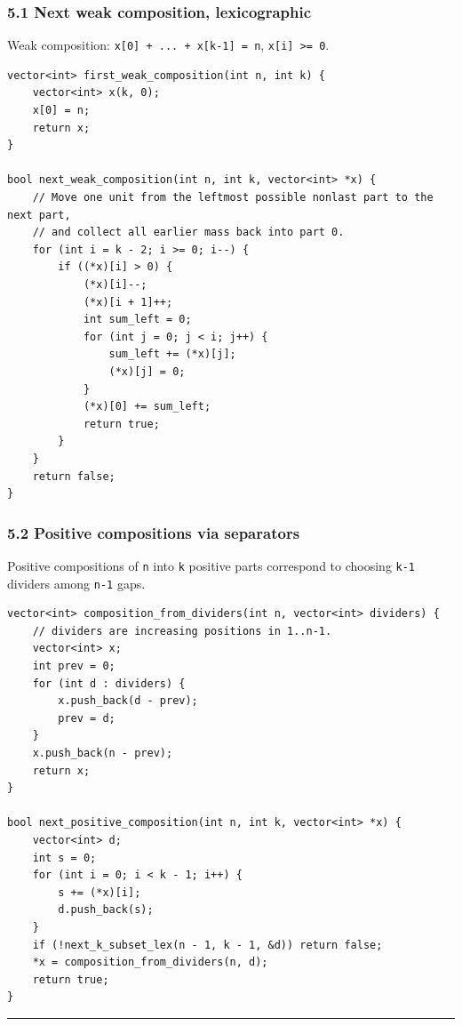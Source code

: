 \documentclass[11pt]{article}
\begin{document}
\subsubsection{5.1 Next weak composition, lexicographic}\label{next-weak-composition-lexicographic}

Weak composition: \texttt{x[0] + ... + x[k-1] = n}, \texttt{x[i] >= 0}.

\begin{verbatim}
vector<int> first_weak_composition(int n, int k) {
    vector<int> x(k, 0);
    x[0] = n;
    return x;
}

bool next_weak_composition(int n, int k, vector<int> *x) {
    // Move one unit from the leftmost possible nonlast part to the next part,
    // and collect all earlier mass back into part 0.
    for (int i = k - 2; i >= 0; i--) {
        if ((*x)[i] > 0) {
            (*x)[i]--;
            (*x)[i + 1]++;
            int sum_left = 0;
            for (int j = 0; j < i; j++) {
                sum_left += (*x)[j];
                (*x)[j] = 0;
            }
            (*x)[0] += sum_left;
            return true;
        }
    }
    return false;
}
\end{verbatim}

\subsubsection{5.2 Positive compositions via separators}\label{positive-compositions-via-separators}

Positive compositions of \texttt{n} into \texttt{k} positive parts correspond to choosing \texttt{k-1} dividers among \texttt{n-1} gaps.

\begin{verbatim}
vector<int> composition_from_dividers(int n, vector<int> dividers) {
    // dividers are increasing positions in 1..n-1.
    vector<int> x;
    int prev = 0;
    for (int d : dividers) {
        x.push_back(d - prev);
        prev = d;
    }
    x.push_back(n - prev);
    return x;
}

bool next_positive_composition(int n, int k, vector<int> *x) {
    vector<int> d;
    int s = 0;
    for (int i = 0; i < k - 1; i++) {
        s += (*x)[i];
        d.push_back(s);
    }
    if (!next_k_subset_lex(n - 1, k - 1, &d)) return false;
    *x = composition_from_dividers(n, d);
    return true;
}
\end{verbatim}

\begin{center}\rule{0.5\linewidth}{0.5pt}\end{center}
\end{document}
